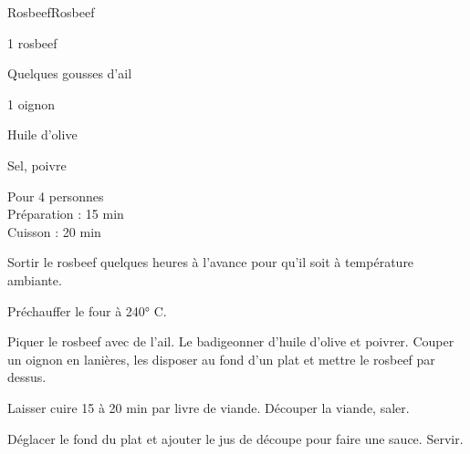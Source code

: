 \begin{recette}{Rosbeef}{Rosbeef}

\begin{ingredients}
1 rosbeef\par
Quelques gousses d'ail\par
1 oignon\par
Huile d'olive\par
Sel, poivre\par
\end{ingredients}

\begin{infos}
Pour 4 personnes\\
Préparation : 15 min\\
Cuisson : 20 min\\
\end{infos}

\begin{etapes}
\item Sortir le rosbeef quelques heures à l'avance pour qu'il soit à température ambiante.
\item Préchauffer le four à 240° C.
\item Piquer le rosbeef avec de l'ail. Le badigeonner d'huile d'olive et poivrer. Couper un oignon en lanières, les disposer au fond d'un plat et mettre le rosbeef par dessus.
\item Laisser cuire 15 à 20 min par livre de viande. Découper la viande, saler.
\item Déglacer le fond du plat et ajouter le jus de découpe pour faire une sauce. Servir.
\end{etapes}

\end{recette}